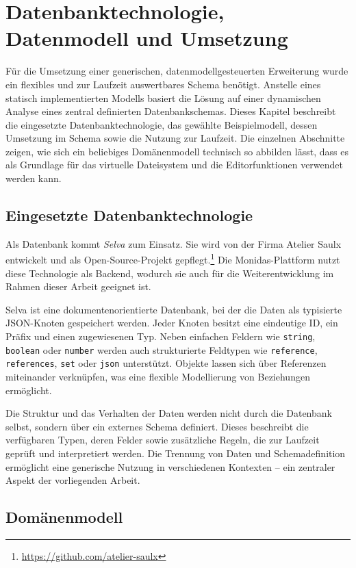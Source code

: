 \section{Datenbanktechnologie, Datenmodell und Umsetzung}

Für die Umsetzung einer generischen, datenmodellgesteuerten Erweiterung wurde ein flexibles und zur Laufzeit auswertbares Schema benötigt. Anstelle eines statisch implementierten Modells basiert die Lösung auf einer dynamischen Analyse eines zentral definierten Datenbankschemas. Dieses Kapitel beschreibt die eingesetzte Datenbanktechnologie, das gewählte Beispielmodell, dessen Umsetzung im Schema sowie die Nutzung zur Laufzeit. Die einzelnen Abschnitte zeigen, wie sich ein beliebiges Domänenmodell technisch so abbilden lässt, dass es als Grundlage für das virtuelle Dateisystem und die Editorfunktionen verwendet werden kann.

\subsection{Eingesetzte Datenbanktechnologie}

Als Datenbank kommt \textit{Selva} zum Einsatz. Sie wird von der Firma Atelier Saulx entwickelt und als Open-Source-Projekt gepflegt.\footnote{\url{https://github.com/atelier-saulx}} Die Monidas-Plattform nutzt diese Technologie als Backend, wodurch sie auch für die Weiterentwicklung im Rahmen dieser Arbeit geeignet ist.

Selva ist eine dokumentenorientierte Datenbank, bei der die Daten als typisierte JSON-Knoten gespeichert werden. Jeder Knoten besitzt eine eindeutige ID, ein Präfix und einen zugewiesenen Typ. Neben einfachen Feldern wie \texttt{string}, \texttt{boolean} oder \texttt{number} werden auch strukturierte Feldtypen wie \texttt{reference}, \texttt{references}, \texttt{set} oder \texttt{json} unterstützt. Objekte lassen sich über Referenzen miteinander verknüpfen, was eine flexible Modellierung von Beziehungen ermöglicht.

Die Struktur und das Verhalten der Daten werden nicht durch die Datenbank selbst, sondern über ein externes Schema definiert. Dieses beschreibt die verfügbaren Typen, deren Felder sowie zusätzliche Regeln, die zur Laufzeit geprüft und interpretiert werden. Die Trennung von Daten und Schemadefinition ermöglicht eine generische Nutzung in verschiedenen Kontexten – ein zentraler Aspekt der vorliegenden Arbeit.

\subsection{Domänenmodell}

